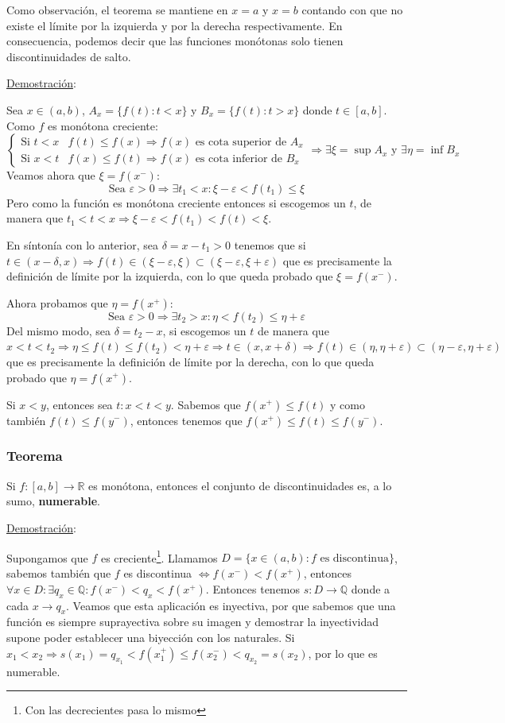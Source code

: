 \documentclass[10pt,a4paper,openright]{book}
\begin{document}
Como observación, el teorema se mantiene en $x=a$ y $x=b$ contando con que no existe el límite por la izquierda y por la derecha respectivamente. En consecuencia, podemos decir que las funciones monótonas solo tienen discontinuidades de salto.

\underline{Demostración}:\par
Sea $x\in (a,b)$, $A_x=\{f(t): t<x\}$ y $B_x=\{f(t): t>x\}$ donde $t\in [a,b]$. Como $f$ es monótona creciente:
$$\begin{cases}\mbox{Si }t< x & f(t)\leq f(x)\Rightarrow f(x)\mbox{ es cota superior de }A_x \\\mbox{Si } x<t & f(x)\leq f(t)\Rightarrow f(x)\mbox{ es cota inferior de }B_x\end{cases}\Rightarrow \exists \xi=\sup A_x\mbox{ y }\exists \eta=\inf B_x$$
Veamos ahora que $\xi=f(x^-)$:
$$\mbox{Sea }\varepsilon>0\Rightarrow \exists t_1<x: \xi-\varepsilon< f(t_1)\leq \xi$$
Pero como la función es monótona creciente entonces si escogemos un $t$, de manera que $t_1<t<x\Rightarrow \xi- \varepsilon<f(t_1)<f(t)<\xi$.

En síntonía con lo anterior, sea $\delta= x-t_1>0$ tenemos que si $t\in (x-\delta, x)\Rightarrow f(t)\in (\xi-\varepsilon, \xi)\subset (\xi-\varepsilon, \xi+ \varepsilon)$ que es precisamente la definición de límite por la izquierda, con lo que queda probado que  $\xi=f(x^-)$.

Ahora probamos que $\eta=f(x^+)$:
$$\mbox{Sea }\varepsilon>0\Rightarrow \exists t_2>x: \eta< f(t_2)\leq \eta+ \varepsilon$$
Del mismo modo, sea $\delta= t_2-x$, si escogemos un $t$ de manera que $x<t<t_2\Rightarrow \eta\leq f(t)\leq f(t_2)<\eta+ \varepsilon \Rightarrow t\in (x, x+\delta)\Rightarrow f(t)\in (\eta, \eta+\varepsilon)\subset (\eta-\varepsilon, \eta+ \varepsilon)$ que es precisamente la definición de límite por la derecha, con lo que queda probado que  $\eta=f(x^+)$.

Si $x<y$, entonces sea $t: x<t<y$. Sabemos que $f(x^+)\leq f(t)$ y como también $f(t)\leq f(y^-)$, entonces tenemos que $f(x^+)\leq f(t)\leq f(y^-)$.

\subsubsection*{Teorema}
Si $f:[a,b]\rightarrow \mathbb R$ es monótona, entonces el conjunto de discontinuidades es, a lo sumo, \textbf{numerable}.

\underline{Demostración}: \par
Supongamos que $f$ es creciente\footnote{Con las decrecientes pasa lo mismo}. Llamamos $D=\{x\in (a,b): f \mbox{ es discontinua}\}$, sabemos también que $f$ es discontinua $\Leftrightarrow f(x^-)< f(x^+)$, entonces $\forall x \in D: \exists q_x\in \mathbb Q: f(x^-)<q_x<f(x^+)$. Entonces tenemos $s:D \rightarrow \mathbb Q$ donde a cada $x\rightarrow q_x$. Veamos que esta aplicación es inyectiva, por que sabemos que una función es siempre suprayectiva sobre su imagen y demostrar la inyectividad supone poder establecer una biyección con los naturales. Si $x_1<x_2\Rightarrow s(x_1)=q_{x_1}<f(x_1^+)\leq f(x_2^-)< q_{x_2}=s(x_2)$, por lo que es numerable.
\end{document}
